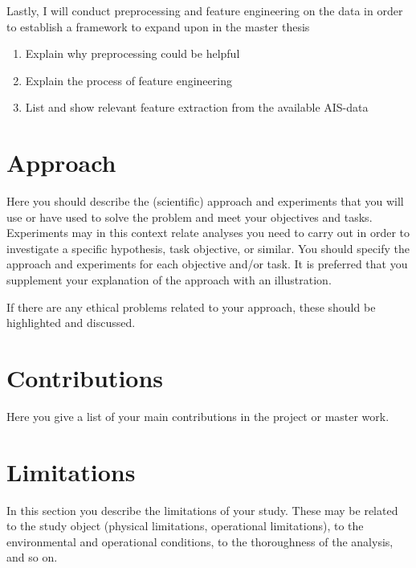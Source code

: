 Lastly, I will conduct preprocessing and feature engineering on the data in order to establish a framework to expand upon in the master thesis
\begin{enumerate}
	\item Explain why preprocessing could be helpful
	\item Explain the process of feature engineering
	\item List and show relevant feature extraction from the available AIS-data
\end{enumerate}


\section{Approach}
\label{sec:approach}
\begin{info}
	Here you should describe the (scientific) approach and experiments that you will use or have used to solve the problem and meet your objectives and tasks. Experiments may in this context relate analyses you need to carry out in order to investigate a specific hypothesis, task objective, or similar. You should specify the approach and experiments for each objective and/or task. It is preferred that you supplement your explanation of the approach with an illustration.

	If there are any ethical problems related to your approach, these should be highlighted and discussed.
\end{info}



\section{Contributions}
\label{sec:contributions}
\begin{info}
	Here you give a list of your main contributions in the project or master work.
\end{info}



\section{Limitations}
\label{sec:limitations}
\begin{info}
	In this section you describe the limitations of your study. These may be related to the study object (physical limitations, operational limitations), to the environmental and operational conditions, to the thoroughness of the analysis, and so on.
\end{info}



